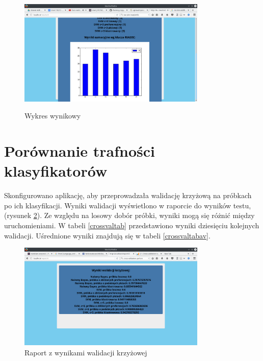 \documentclass[12pt,a4paper,oneside]{report} %
\begin{document}
\begin{figure}
\centering
\includegraphics[width=0.8\textwidth]{10.png}
\label{outputs}
\caption{Wykres wynikowy}
\end{figure}

\section{Porównanie trafności klasyfikatorów}

Skonfigurowano aplikację, aby przeprowadzała walidację krzyżową na próbkach po ich klasyfikacji. Wyniki walidacji wyświetlono w raporcie do wyników testu, (rysunek \ref{crossvalidation}). Ze względu na losowy dobór próbki, wyniki mogą się różnić między uruchomieniami. W tabeli \ref{crossvaltab} przedstawiono wyniki dziesięciu kolejnych walidacji. Uśrednione wyniki znajdują się w tabeli \ref{crossvaltabav}.

\begin{figure}
\centering
\includegraphics[width=0.8\textwidth]{5.png}
\caption{Raport z wynikami walidacji krzyżowej\label{crossvalidation}}
\end{figure}
\end{document}
